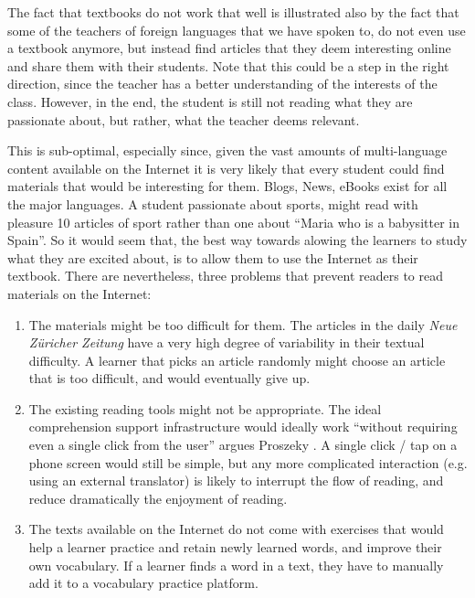 

The fact that textbooks do not work that well is illustrated also by the fact that some of the teachers of foreign languages that we have spoken to, do not even use a textbook anymore, but instead find articles that they deem interesting online and share them with their students. Note that this could be a step in the right direction, since the teacher has a better understanding of the interests of the class. However, in the end, the student is still not reading what they are passionate about, but rather, what the teacher deems relevant. 

This is sub-optimal, especially since, given the vast amounts of multi-language content available on the Internet it is very likely that every student could find materials that would be interesting for them. Blogs, News, eBooks exist for all the major languages. A student passionate about sports, might read with pleasure 10 articles of sport rather than one about ``Maria who is a babysitter in Spain''. So it would seem that, the best way towards alowing the learners to study what they are excited about, is to allow them to use the Internet as their textbook. There are nevertheless, three problems that prevent readers to read materials on the Internet:

\begin{enumerate}
	
  \item The materials might be too difficult for them. The articles in the  daily {\em Neue Z\"uricher Zeitung} have a very high degree of variability in their textual difficulty. A learner that picks an article randomly might choose an article that is too difficult, and would eventually give up. 

  \item The existing reading tools might not be appropriate. The ideal comprehension support infrastructure would ideally work ``without requiring even a single click from the user'' argues Proszeky \cite{Proszeky02-Comprehension}. A single click / tap on a phone screen would still be simple, but any more complicated interaction (e.g. using an external translator) is likely to interrupt the flow of reading, and reduce dramatically the enjoyment of reading. 
  
  \item The texts available on the Internet do not come with exercises that would help a learner practice and retain newly learned words, and improve their own vocabulary. If a learner finds a word in a text, they have to manually add it to a vocabulary practice platform. 
  
\end{enumerate}

